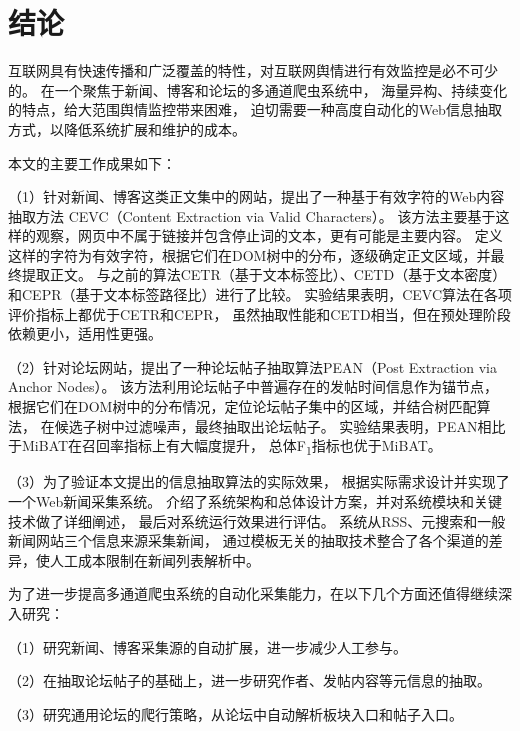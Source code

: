 
\chapter*{结\quad 论}
{}

互联网具有快速传播和广泛覆盖的特性，对互联网舆情进行有效监控是必不可少的。
在一个聚焦于新闻、博客和论坛的多通道爬虫系统中，
海量异构、持续变化的特点，给大范围舆情监控带来困难，
迫切需要一种高度自动化的Web信息抽取方式，以降低系统扩展和维护的成本。

本文的主要工作成果如下：

（1）针对新闻、博客这类正文集中的网站，提出了一种基于有效字符的Web内容抽取方法
CEVC（Content Extraction via Valid Characters）。
该方法主要基于这样的观察，网页中不属于链接并包含停止词的文本，更有可能是主要内容。
定义这样的字符为有效字符，根据它们在DOM树中的分布，逐级确定正文区域，并最终提取正文。
与之前的算法CETR（基于文本标签比）、CETD（基于文本密度）
和CEPR（基于文本标签路径比）进行了比较。
实验结果表明，CEVC算法在各项评价指标上都优于CETR和CEPR，
虽然抽取性能和CETD相当，但在预处理阶段依赖更小，适用性更强。

（2）针对论坛网站，提出了一种论坛帖子抽取算法PEAN（Post Extraction via Anchor Nodes）。
该方法利用论坛帖子中普遍存在的发帖时间信息作为锚节点，
根据它们在DOM树中的分布情况，定位论坛帖子集中的区域，并结合树匹配算法，
在候选子树中过滤噪声，最终抽取出论坛帖子。
实验结果表明，PEAN相比于MiBAT在召回率指标上有大幅度提升，
总体F\textsubscript{1}指标也优于MiBAT。

（3）为了验证本文提出的信息抽取算法的实际效果，
根据实际需求设计并实现了一个Web新闻采集系统。
介绍了系统架构和总体设计方案，并对系统模块和关键技术做了详细阐述，
最后对系统运行效果进行评估。
系统从RSS、元搜索和一般新闻网站三个信息来源采集新闻，
通过模板无关的抽取技术整合了各个渠道的差异，使人工成本限制在新闻列表解析中。

为了进一步提高多通道爬虫系统的自动化采集能力，在以下几个方面还值得继续深入研究：

（1）研究新闻、博客采集源的自动扩展，进一步减少人工参与。

（2）在抽取论坛帖子的基础上，进一步研究作者、发帖内容等元信息的抽取。

（3）研究通用论坛的爬行策略，从论坛中自动解析板块入口和帖子入口。
